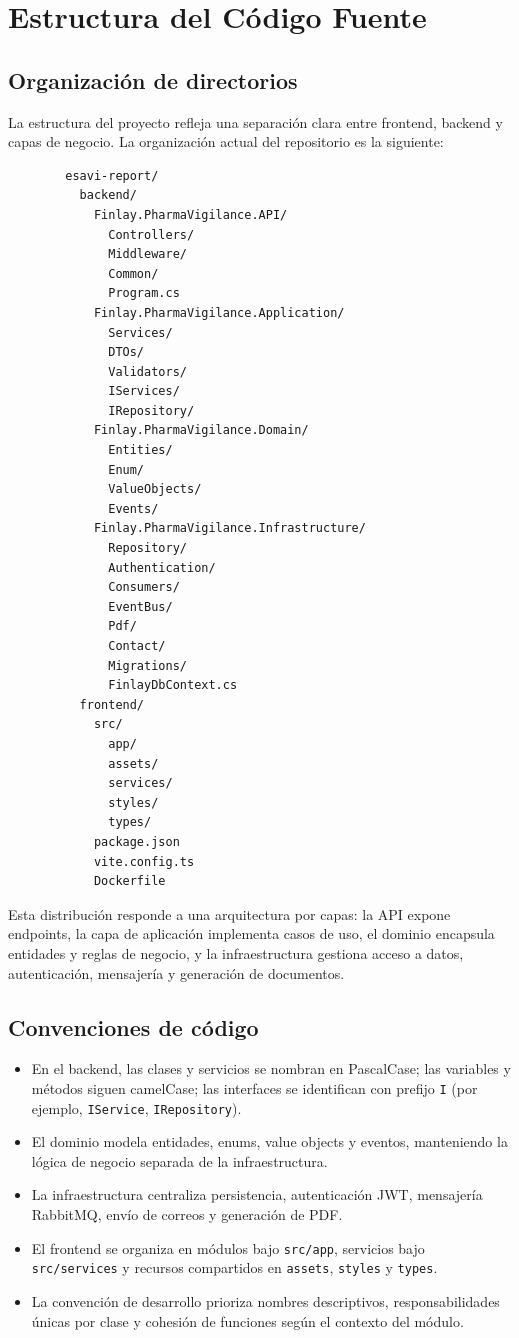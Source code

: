 \documentclass[12pt,letterpaper]{article}
\begin{document}
	\section{Estructura del Código Fuente}
	
	\subsection{Organización de directorios}
	
	La estructura del proyecto refleja una separación clara entre frontend, backend y capas de negocio. La organización actual del repositorio es la siguiente:
	
	\begin{verbatim}
		esavi-report/
		  backend/
		    Finlay.PharmaVigilance.API/
		      Controllers/
		      Middleware/
		      Common/
		      Program.cs
		    Finlay.PharmaVigilance.Application/
		      Services/
		      DTOs/
		      Validators/
		      IServices/
		      IRepository/
		    Finlay.PharmaVigilance.Domain/
		      Entities/
		      Enum/
		      ValueObjects/
		      Events/
		    Finlay.PharmaVigilance.Infrastructure/
		      Repository/
		      Authentication/
		      Consumers/
		      EventBus/
		      Pdf/
		      Contact/
		      Migrations/
		      FinlayDbContext.cs
		  frontend/
		    src/
		      app/
		      assets/
		      services/
		      styles/
		      types/
		    package.json
		    vite.config.ts
		    Dockerfile
	\end{verbatim}
	
	Esta distribución responde a una arquitectura por capas: la API expone endpoints, la capa de aplicación implementa casos de uso, el dominio encapsula entidades y reglas de negocio, y la infraestructura gestiona acceso a datos, autenticación, mensajería y generación de documentos.
	
	\subsection{Convenciones de código}
	
	\begin{itemize}
		\item En el backend, las clases y servicios se nombran en PascalCase; las variables y métodos siguen camelCase; las interfaces se identifican con prefijo \texttt{I} (por ejemplo, \texttt{IService}, \texttt{IRepository}).
		\item El dominio modela entidades, enums, value objects y eventos, manteniendo la lógica de negocio separada de la infraestructura.
		\item La infraestructura centraliza persistencia, autenticación JWT, mensajería RabbitMQ, envío de correos y generación de PDF.
		\item El frontend se organiza en módulos bajo \texttt{src/app}, servicios bajo \texttt{src/services} y recursos compartidos en \texttt{assets}, \texttt{styles} y \texttt{types}.
		\item La convención de desarrollo prioriza nombres descriptivos, responsabilidades únicas por clase y cohesión de funciones según el contexto del módulo.
	\end{itemize}
	
\end{document}
